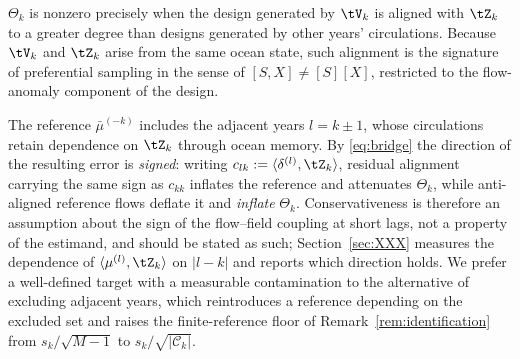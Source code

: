 \begin{remark}
\label{rem:interpretation}
$\Theta_k$ is nonzero precisely when the design generated by $\tV_k$ is aligned with $\tZ_k$ to a
greater degree than designs generated by other years' circulations. Because $\tV_k$ and $\tZ_k$
arise from the same ocean state, such alignment is the signature of preferential sampling in the
sense of $[S,X] \neq [S][X]$, restricted to the flow-anomaly component of the design.

The reference $\bar{\mu}^{(-k)}$ includes the adjacent years $l = k \pm 1$, whose circulations retain
dependence on $\tZ_k$ through ocean memory. By \eqref{eq:bridge} the direction of the resulting
error is \emph{signed}: writing $c_{lk} := \langle \delta^{(l)}, \tZ_k\rangle$, residual alignment
carrying the same sign as $c_{kk}$ inflates the reference and attenuates $\Theta_k$, while
anti-aligned reference flows deflate it and \emph{inflate} $\Theta_k$. Conservativeness is therefore
an assumption about the sign of the flow--field coupling at short lags, not a property of the
estimand, and should be stated as such; Section~\ref{sec:XXX} measures the dependence of
$\langle \mu^{(l)}, \tZ_k\rangle$ on $|l-k|$ and reports which direction holds. We prefer a
well-defined target with a measurable contamination to the alternative of excluding adjacent years,
which reintroduces a reference depending on the excluded set and raises the finite-reference floor
of Remark~\ref{rem:identification} from $s_k/\sqrt{M-1}$ to $s_k/\sqrt{|\mathcal{C}_k|}$.
\end{remark}

